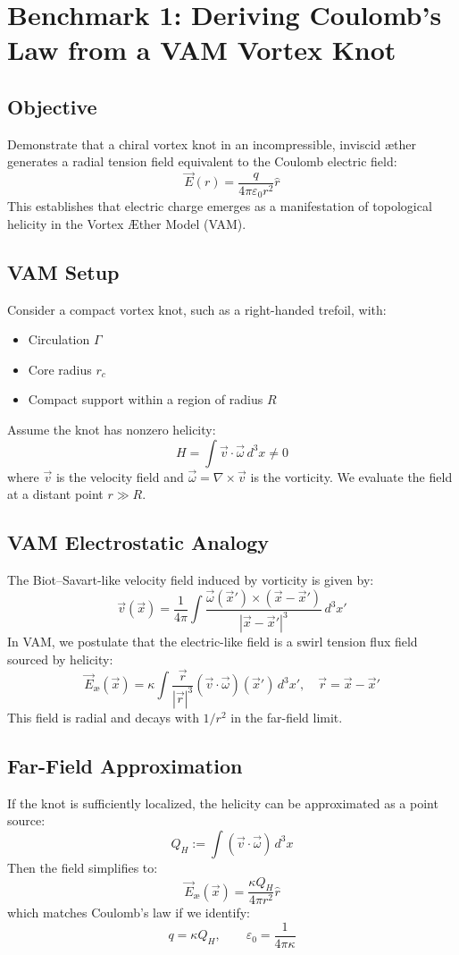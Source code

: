 \section{Benchmark 1: Deriving Coulomb's Law from a VAM Vortex Knot}

\subsection*{Objective}
Demonstrate that a chiral vortex knot in an incompressible, inviscid æther generates a radial tension field equivalent to the Coulomb electric field:
\[
\vec{E}(r) = \frac{q}{4\pi \varepsilon_0 r^2} \hat{r}
\]
This establishes that electric charge emerges as a manifestation of topological helicity in the Vortex Æther Model (VAM).

\subsection*{VAM Setup}
Consider a compact vortex knot, such as a right-handed trefoil, with:
\begin{itemize}
    \item Circulation $\Gamma$
    \item Core radius $r_c$
    \item Compact support within a region of radius $R$
\end{itemize}
Assume the knot has nonzero helicity:
\[
H = \int \vec{v} \cdot \vec{\omega} \, d^3x \neq 0
\]
where $\vec{v}$ is the velocity field and $\vec{\omega} = \nabla \times \vec{v}$ is the vorticity. We evaluate the field at a distant point $r \gg R$.

\subsection*{VAM Electrostatic Analogy}
The Biot--Savart-like velocity field induced by vorticity is given by:
\[
\vec{v}(\vec{x}) = \frac{1}{4\pi} \int \frac{\vec{\omega}(\vec{x}') \times (\vec{x} - \vec{x}')}{|\vec{x} - \vec{x}'|^3} \, d^3x'
\]
In VAM, we postulate that the electric-like field is a swirl tension flux field sourced by helicity:
\[
\vec{E}_\text{\ae}(\vec{x}) = \kappa \int \frac{\vec{r}}{|\vec{r}|^3} \left( \vec{v} \cdot \vec{\omega} \right)(\vec{x}') \, d^3x', \quad \vec{r} = \vec{x} - \vec{x}'
\]
This field is radial and decays with $1/r^2$ in the far-field limit.

\subsection*{Far-Field Approximation}
If the knot is sufficiently localized, the helicity can be approximated as a point source:
\[
Q_H := \int \left( \vec{v} \cdot \vec{\omega} \right) \, d^3x
\]
Then the field simplifies to:
\[
\vec{E}_\text{\ae}(\vec{x}) = \frac{\kappa Q_H}{4\pi r^2} \hat{r}
\]
which matches Coulomb's law if we identify:
\[
q = \kappa Q_H, \qquad \varepsilon_0 = \frac{1}{4\pi \kappa}
\]

